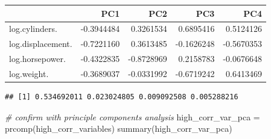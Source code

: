 \documentclass[
]{article}
\newenvironment{Shaded}{\begin{snugshade}}{\end{snugshade}}
\newcommand{\CommentTok}[1]{\textcolor[rgb]{0.56,0.35,0.01}{\textit{#1}}}
\newcommand{\FunctionTok}[1]{\textcolor[rgb]{0.00,0.00,0.00}{#1}}
\newcommand{\NormalTok}[1]{#1}
\newcommand{\OtherTok}[1]{\textcolor[rgb]{0.56,0.35,0.01}{#1}}
\newcommand{\SpecialCharTok}[1]{\textcolor[rgb]{0.00,0.00,0.00}{#1}}
\newcommand{\StringTok}[1]{\textcolor[rgb]{0.31,0.60,0.02}{#1}}
\begin{document}
\begin{Shaded}
\end{Shaded}

\begin{longtable}[]{@{}lrrrr@{}}
\toprule
& PC1 & PC2 & PC3 & PC4 \\
\midrule
\endhead
log.cylinders. & -0.3944484 & 0.3261534 & 0.6895416 & 0.5124126 \\
log.displacement. & -0.7221160 & 0.3613485 & -0.1626248 & -0.5670353 \\
log.horsepower. & -0.4322835 & -0.8728969 & 0.2158783 & -0.0676648 \\
log.weight. & -0.3689037 & -0.0331992 & -0.6719242 & 0.6413469 \\
\bottomrule
\end{longtable}

\begin{Shaded}
\end{Shaded}

\begin{verbatim}
## [1] 0.534692011 0.023024805 0.009092508 0.005288216
\end{verbatim}

\begin{Shaded}
\begin{Highlighting}[]
\CommentTok{\# confirm with principle components analysis}
\NormalTok{high\_corr\_var\_pca }\OtherTok{=} \FunctionTok{prcomp}\NormalTok{(high\_corr\_variables)}
\FunctionTok{summary}\NormalTok{(high\_corr\_var\_pca)}
\end{Highlighting}
\end{Shaded}
\end{document}
